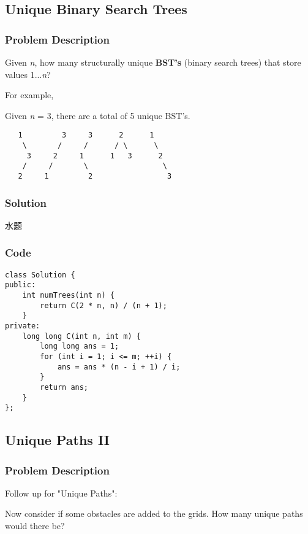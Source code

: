 \documentclass[courier]{article}
\begin{document}
\begin{CJK*}{UTF8}{gkai}
\subsection{ Unique Binary Search Trees }

\subsubsection*{Problem Description}
Given \emph{n}, how many structurally unique \textbf{BST's} (binary search trees) that store values 1...\emph{n}?

For example,


Given \emph{n} = 3, there are a total of 5 unique BST's.

\begin{verbatim}
   1         3     3      2      1
    \       /     /      / \      \
     3     2     1      1   3      2
    /     /       \                 \
   2     1         2                 3
\end{verbatim}



\subsubsection*{Solution}
水题

\subsubsection*{Code}
\begin{lstlisting}
class Solution {
public:
    int numTrees(int n) {
        return C(2 * n, n) / (n + 1);
    }
private:
    long long C(int n, int m) {
        long long ans = 1;
        for (int i = 1; i <= m; ++i) {
            ans = ans * (n - i + 1) / i;
        }
        return ans;
    }
}; 
\end{lstlisting}


\subsection{ Unique Paths II }

\subsubsection*{Problem Description}
Follow up for "Unique Paths":

Now consider if some obstacles are added to the grids. How many unique paths would there be?


\end{CJK*}
\end{document}
